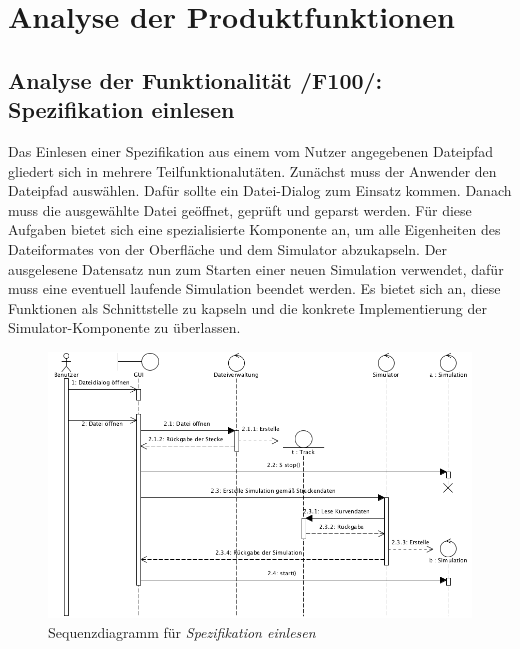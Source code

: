 \chapter{Analyse der Produktfunktionen}

%

\section{Analyse der Funktionalität /F100/: Spezifikation einlesen}
Das Einlesen einer Spezifikation aus einem vom Nutzer angegebenen Dateipfad
gliedert sich in mehrere Teilfunktionalutäten. Zunächst muss der Anwender den
Dateipfad auswählen. Dafür sollte ein Datei-Dialog zum Einsatz kommen.
Danach muss die ausgewählte Datei geöffnet, geprüft und geparst werden. Für
diese Aufgaben bietet sich eine spezialisierte Komponente an, um alle
Eigenheiten des Dateiformates von der Oberfläche und dem Simulator abzukapseln.
Der ausgelesene Datensatz nun zum Starten einer neuen Simulation verwendet,
dafür muss eine eventuell laufende Simulation beendet werden. Es bietet sich
an, diese Funktionen als Schnittstelle zu kapseln und die konkrete Implementierung
der Simulator-Komponente zu überlassen.

\begin{figure}
\includegraphics[width=16cm]{bilder/spezifikation_einlesen}
\caption{Sequenzdiagramm für \textit{Spezifikation einlesen}}
\end{figure}

